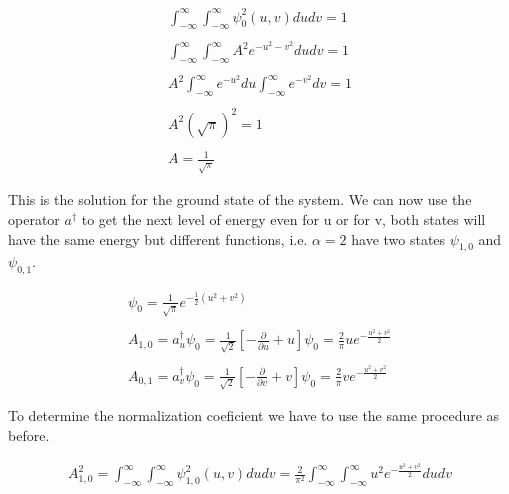 \begin{equation}
  \begin{array}{c}
    \int_{-\infty}^{\infty}\int_{-\infty}^{\infty} \psi_0^2(u,v) du dv = 1
    \\

    \\
    \int_{-\infty}^{\infty}\int_{-\infty}^{\infty} A^2 e^{-u^2-v^2} du dv = 1
    \\

    \\
    A^2 \int_{-\infty}^{\infty} e^{-u^2} du \int_{-\infty}^{\infty} e^{-v^2} dv = 1
    \\

    \\
    A^2 \left(\sqrt{\pi}\right)^2 = 1
    \\

    \\
    A = \frac{1}{\sqrt{\pi}}
  \end{array}
\end{equation}

This is the solution for the ground state of the system. We can now use the operator $a^{\dagger}$ to get the next level of energy even for u or for v, both states will have the same energy but different functions, i.e. $\alpha=2$ have two states $\psi_{1,0}$ and $\psi_{0,1}$.

\begin{equation}
  \begin{array}{c}
    \psi_0 = \frac{1}{\sqrt{\pi}} e^{-\frac{1}{2}(u^2+v^2)}
    \\

    \\
    A_{1,0} = a_u^{\dagger} \psi_0 = \frac{1}{\sqrt{2}}\left[-\frac{\partial}{\partial u}+u\right]\psi_0 = \frac{2}{\pi} u e^{-\frac{u^2+v^2}{2}}
    \\

    \\
    A_{0,1} = a_v^{\dagger} \psi_0 = \frac{1}{\sqrt{2}}\left[-\frac{\partial}{\partial v}+v\right]\psi_0 = \frac{2}{\pi} v e^{-\frac{u^2+v^2}{2}}
  \end{array}
\end{equation}

To determine the normalization coeficient we have to use the same procedure as before.

\begin{equation}
  \begin{array}{c}
    A^2_{1,0} = \int_{-\infty}^{\infty}\int_{-\infty}^{\infty} \psi_{1,0}^2(u,v) du dv = \frac{2}{\pi^2} \int_{-\infty}^{\infty}\int_{-\infty}^{\infty} u^2 e^{-\frac{u^2+v^2}{2}} du dv
  \end{array}
\end{equation}

